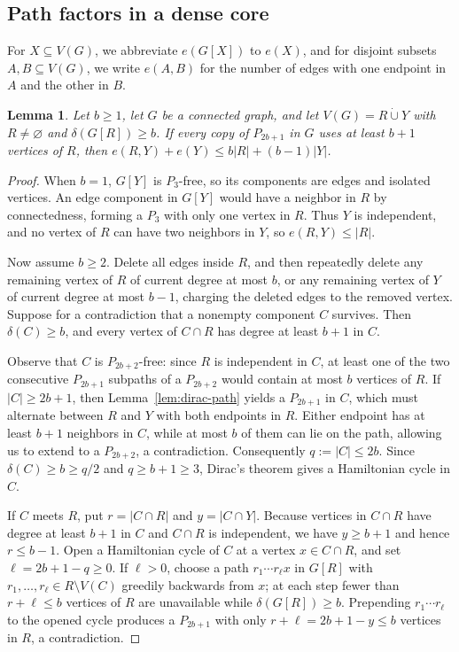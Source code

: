 \documentclass[10pt]{article}
\theoremstyle{compactplain}
\newtheorem{lemma}[theorem]{Lemma}
\theoremstyle{remark}\newtheorem{remark}[theorem]{Remark}
\begin{document}
\subsection{Path factors in a dense core}

For $X\subseteq V(G)$, we abbreviate $e(G[X])$ to $e(X)$, and for
disjoint subsets $A,B\subseteq V(G)$, we write $e(A,B)$ for the number
of edges with one endpoint in $A$ and the other in $B$.

\begin{lemma}\label{lem:rooted-joint}
Let $b\ge1$, let $G$ be a connected graph, and let $V(G)=R\dot\cup Y$
with $R\ne\varnothing$ and $\delta(G[R])\ge b$. If every copy of
$P_{2b+1}$ in $G$ uses at least $b+1$ vertices of $R$, then
$e(R,Y)+e(Y)\le b|R|+(b-1)|Y|$.
\end{lemma}
\begin{proof}
When $b=1$, $G[Y]$ is $P_3$-free, so its components are edges and
isolated vertices. An edge component in $G[Y]$ would have a neighbor in
$R$ by connectedness, forming a $P_3$ with only one vertex in $R$. Thus
$Y$ is independent, and no vertex of $R$ can have two neighbors in $Y$,
so $e(R,Y)\le|R|$.

Now assume $b\ge2$. Delete all edges inside $R$, and then repeatedly
delete any remaining vertex of $R$ of current degree at most $b$, or any
remaining vertex of $Y$ of current degree at most $b-1$, charging the
deleted edges to the removed vertex. Suppose for a contradiction that a
nonempty component $C$ survives. Then $\delta(C)\ge b$, and every vertex
of $C\cap R$ has degree at least $b+1$ in $C$.

Observe that $C$ is $P_{2b+2}$-free: since $R$ is independent in $C$, at
least one of the two consecutive $P_{2b+1}$ subpaths of a $P_{2b+2}$
would contain at most $b$ vertices of $R$. If $|C|\ge2b+1$, then
Lemma~\ref{lem:dirac-path} yields a $P_{2b+1}$ in $C$, which must
alternate between $R$ and $Y$ with both endpoints in $R$. Either
endpoint has at least $b+1$ neighbors in $C$, while at most $b$ of them
can lie on the path, allowing us to extend to a $P_{2b+2}$, a
contradiction. Consequently $q:=|C|\le2b$. Since $\delta(C)\ge b\ge q/2$
and $q\ge b+1\ge3$, Dirac's theorem gives a Hamiltonian cycle in $C$.

If $C$ meets $R$, put $r=|C\cap R|$ and $y=|C\cap Y|$. Because vertices
in $C\cap R$ have degree at least $b+1$ in $C$ and $C\cap R$ is
independent, we have $y\ge b+1$ and hence $r\le b-1$. Open a Hamiltonian
cycle of $C$ at a vertex $x\in C\cap R$, and set $\ell=2b+1-q\ge0$. If
$\ell>0$, choose a path $r_1\cdots r_\ell x$ in $G[R]$ with
$r_1,\ldots,r_\ell\in R\setminus V(C)$ greedily backwards from $x$; at
each step fewer than $r+\ell\le b$ vertices of $R$ are unavailable while
$\delta(G[R])\ge b$. Prepending $r_1\cdots r_\ell$ to the opened cycle
produces a $P_{2b+1}$ with only $r+\ell=2b+1-y\le b$ vertices in $R$, a
contradiction.


\end{proof}
\end{document}
